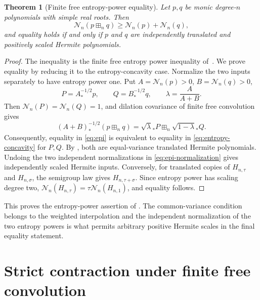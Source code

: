 \documentclass[12pt,reqno]{amsart}
\newtheorem{theorem}{Theorem}[section]
\theoremstyle{definition}
\theoremstyle{remark}
\newcommand{\cN}{\mathcal N}
\begin{document}
\begin{theorem}[Finite free entropy-power equality]
\label{thm:epi-equality}
Let \(p,q\) be monic degree-\(n\) polynomials with simple real roots.  Then
\begin{equation}\label{eq:epi}
 \cN_n(p\boxplus_nq)\geq\cN_n(p)+\cN_n(q),
\end{equation}
and equality holds if and only if \(p\) and \(q\) are independently
translated and positively scaled Hermite polynomials.
\end{theorem}

\begin{proof}
The inequality is the finite free entropy power inequality of~\cite{GVS26}.
We prove equality by reducing it to the entropy-concavity case. Normalize the two inputs separately to have entropy power one.  Put
\(A=\cN_n(p)>0\), \(B=\cN_n(q)>0\),
\begin{equation}\label{eq:epi-normalization}
 P=A^{-1/2}_*p,
 \qquad Q=B^{-1/2}_*q,
 \qquad \lambda=\frac{A}{A+B}.
\end{equation}
Then \(\cN_n(P)=\cN_n(Q)=1\), and dilation covariance of finite
free convolution gives
\begin{equation}\label{eq:epi-to-concavity}
 (A+B)^{-1/2}_*(p\boxplus_nq)
 =\sqrt\lambda_*P\boxplus_n\sqrt{1-\lambda}_*Q.
\end{equation}
Consequently, equality in \eqref{eq:epi} is equivalent to equality in
\eqref{eq:entropy-concavity} for \(P,Q\).  By
, both are equal-variance translated
Hermite polynomials.  Undoing the two independent normalizations in
\eqref{eq:epi-normalization} gives independently scaled Hermite inputs. Conversely, for translated copies of \(H_{n,\tau}\) and \(H_{n,\sigma}\), the semigroup law gives \(H_{n,\tau+\sigma}\).  Since
entropy power has scaling degree two, \(\cN_n(H_{n,\tau})=\tau\cN_n(H_{n,1})\), and equality follows.
\end{proof}

This proves the entropy-power assertion of . The common-variance condition belongs to the weighted interpolation and the independent normalization of the two entropy powers is what permits arbitrary positive Hermite scales in the final equality statement.

\section{Strict contraction under finite free convolution}
\label{sec:strict-transport}
\end{document}
